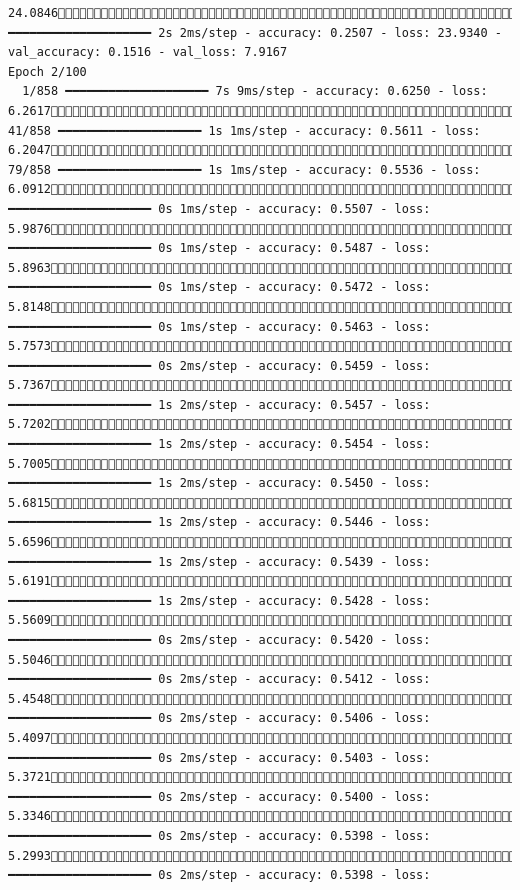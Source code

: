 \documentclass[
  letterpaper,
  DIV=11,
  numbers=noendperiod]{scrartcl}
\begin{document}
\begin{verbatim}
24.0846858/858 ━━━━━━━━━━━━━━━━━━━━ 2s 2ms/step - accuracy: 0.2507 - loss: 23.9340 - val_accuracy: 0.1516 - val_loss: 7.9167
Epoch 2/100
  1/858 ━━━━━━━━━━━━━━━━━━━━ 7s 9ms/step - accuracy: 0.6250 - loss: 6.2617 41/858 ━━━━━━━━━━━━━━━━━━━━ 1s 1ms/step - accuracy: 0.5611 - loss: 6.2047 79/858 ━━━━━━━━━━━━━━━━━━━━ 1s 1ms/step - accuracy: 0.5536 - loss: 6.0912118/858 ━━━━━━━━━━━━━━━━━━━━ 0s 1ms/step - accuracy: 0.5507 - loss: 5.9876157/858 ━━━━━━━━━━━━━━━━━━━━ 0s 1ms/step - accuracy: 0.5487 - loss: 5.8963195/858 ━━━━━━━━━━━━━━━━━━━━ 0s 1ms/step - accuracy: 0.5472 - loss: 5.8148224/858 ━━━━━━━━━━━━━━━━━━━━ 0s 1ms/step - accuracy: 0.5463 - loss: 5.7573235/858 ━━━━━━━━━━━━━━━━━━━━ 0s 2ms/step - accuracy: 0.5459 - loss: 5.7367244/858 ━━━━━━━━━━━━━━━━━━━━ 1s 2ms/step - accuracy: 0.5457 - loss: 5.7202255/858 ━━━━━━━━━━━━━━━━━━━━ 1s 2ms/step - accuracy: 0.5454 - loss: 5.7005266/858 ━━━━━━━━━━━━━━━━━━━━ 1s 2ms/step - accuracy: 0.5450 - loss: 5.6815279/858 ━━━━━━━━━━━━━━━━━━━━ 1s 2ms/step - accuracy: 0.5446 - loss: 5.6596304/858 ━━━━━━━━━━━━━━━━━━━━ 1s 2ms/step - accuracy: 0.5439 - loss: 5.6191343/858 ━━━━━━━━━━━━━━━━━━━━ 1s 2ms/step - accuracy: 0.5428 - loss: 5.5609384/858 ━━━━━━━━━━━━━━━━━━━━ 0s 2ms/step - accuracy: 0.5420 - loss: 5.5046424/858 ━━━━━━━━━━━━━━━━━━━━ 0s 2ms/step - accuracy: 0.5412 - loss: 5.4548463/858 ━━━━━━━━━━━━━━━━━━━━ 0s 2ms/step - accuracy: 0.5406 - loss: 5.4097498/858 ━━━━━━━━━━━━━━━━━━━━ 0s 2ms/step - accuracy: 0.5403 - loss: 5.3721535/858 ━━━━━━━━━━━━━━━━━━━━ 0s 2ms/step - accuracy: 0.5400 - loss: 5.3346572/858 ━━━━━━━━━━━━━━━━━━━━ 0s 2ms/step - accuracy: 0.5398 - loss: 5.2993607/858 ━━━━━━━━━━━━━━━━━━━━ 0s 2ms/step - accuracy: 0.5398 - loss: 
\end{verbatim}
\end{document}
